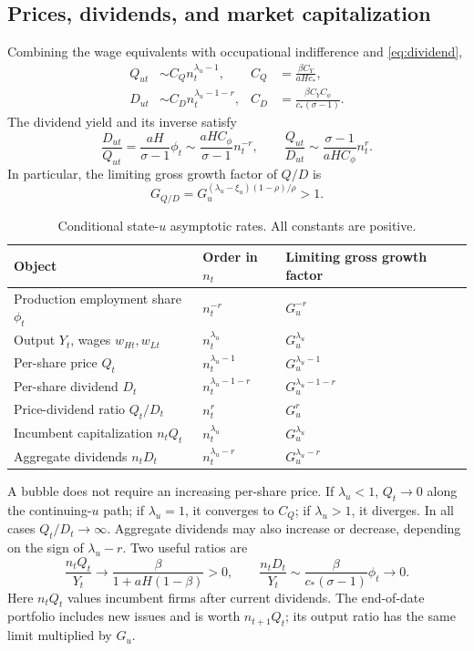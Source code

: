 \documentclass[11pt,a4paper]{article}
\newcommand{\asym}{\sim}
\begin{document}
\subsection{Prices, dividends, and market capitalization}
Combining the wage equivalents with occupational indifference and
\eqref{eq:dividend},
\begin{align}
Q_{ut}&\asym C_Q n_t^{\lambda_u-1}, &
C_Q&=\frac{\beta C_Y}{aHc_*},\label{eq:Qasym}\\
D_{ut}&\asym C_D n_t^{\lambda_u-1-r}, &
C_D&=\frac{\beta C_Y C_\phi}{c_*(\sigma-1)}.\label{eq:Dasym}
\end{align}
The dividend yield and its inverse satisfy
\begin{equation}
\boxed{\frac{D_{ut}}{Q_{ut}}=\frac{aH}{\sigma-1}\phi_t
\asym\frac{aH C_\phi}{\sigma-1}n_t^{-r},\qquad
\frac{Q_{ut}}{D_{ut}}\asym\frac{\sigma-1}{aH C_\phi}n_t^r.}
\label{eq:yield}
\end{equation}
In particular, the limiting gross growth factor of $Q/D$ is
\begin{equation}
\boxed{G_{Q/D}=G_u^{(\lambda_u-\xi_u)(1-\rho)/\rho}>1.}\label{eq:PDgrowth}
\end{equation}

\begin{table}[htbp]
\centering
\caption{Conditional state-$u$ asymptotic rates. All constants are positive.}
\begin{tabular}{lll}
\toprule
Object & Order in $n_t$ & Limiting gross growth factor\\
\midrule
Production employment share $\phi_t$ & $n_t^{-r}$ & $G_u^{-r}$\\
Output $Y_t$, wages $w_{Ht},w_{Lt}$ & $n_t^{\lambda_u}$ & $G_u^{\lambda_u}$\\
Per-share price $Q_t$ & $n_t^{\lambda_u-1}$ & $G_u^{\lambda_u-1}$\\
Per-share dividend $D_t$ & $n_t^{\lambda_u-1-r}$ & $G_u^{\lambda_u-1-r}$\\
Price-dividend ratio $Q_t/D_t$ & $n_t^r$ & $G_u^r$\\
Incumbent capitalization $n_tQ_t$ & $n_t^{\lambda_u}$ & $G_u^{\lambda_u}$\\
Aggregate dividends $n_tD_t$ & $n_t^{\lambda_u-r}$ & $G_u^{\lambda_u-r}$\\
\bottomrule
\end{tabular}
\end{table}

A bubble does not require an increasing per-share price. If $\lambda_u<1$,
$Q_t\to0$ along the continuing-$u$ path; if $\lambda_u=1$, it converges to
$C_Q$; if $\lambda_u>1$, it diverges. In all cases $Q_t/D_t\to\infty$.
Aggregate dividends may also increase or decrease, depending on the sign of
$\lambda_u-r$. Two useful ratios are
\begin{equation}
\frac{n_tQ_t}{Y_t}\longrightarrow
\frac{\beta}{1+aH(1-\beta)}>0,
\qquad
\frac{n_tD_t}{Y_t}\asym\frac{\beta}{c_*(\sigma-1)}\phi_t\longrightarrow0.
\label{eq:aggregateratios}
\end{equation}
Here $n_tQ_t$ values incumbent firms after current dividends. The end-of-date
portfolio includes new issues and is worth $n_{t+1}Q_t$; its output ratio has
the same limit multiplied by $G_u$.
\end{document}
